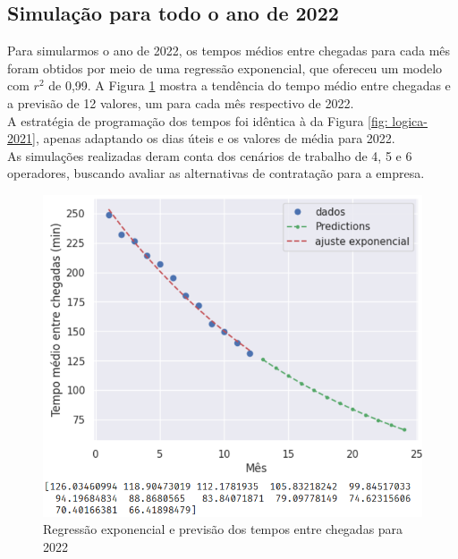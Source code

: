 \subsection{Simulação para todo o ano de 2022}
Para simularmos o ano de 2022, os tempos médios entre chegadas para cada mês foram obtidos por meio de uma regressão exponencial, que ofereceu um modelo com $r^2$ de 0,99. A Figura \ref*{fig: regressao-expo-2022} mostra a tendência do tempo médio entre chegadas e a previsão de 12 valores, um para cada mês respectivo de 2022.\\
A estratégia de programação dos tempos foi idêntica à da Figura \ref*{fig: logica-2021}, apenas adaptando os dias úteis e os valores de média para 2022.\\
As simulações realizadas deram conta dos cenários de trabalho de 4, 5 e 6 operadores, buscando avaliar as alternativas de contratação para a empresa.

\begin{figure}[H]
    \centering
    \includegraphics[scale=1]{simulacao/regressao-expo-2022.png}
    \caption{Regressão exponencial e previsão dos tempos entre chegadas para 2022}
    \label{fig: regressao-expo-2022}
\end{figure}
